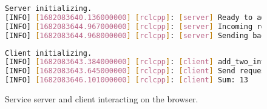         \begin{figure}[htbp]
            \vspace{1em}

            \begin{lstlisting}[language=Bash]
Server initializing.
[INFO] [1682083640.136000000] [rclcpp]: [server] Ready to add two ints.
[INFO] [1682083644.967000000] [rclcpp]: [server] Incoming request X: 5 Y: 8
[INFO] [1682083644.968000000] [rclcpp]: [server] Sending back response: [13]
\end{lstlisting}

            \vspace{2em}

            \begin{lstlisting}[language=Bash]
Client initializing.
[INFO] [1682083643.384000000] [rclcpp]: [client] add_two_ints_client X Y
[INFO] [1682083643.645000000] [rclcpp]: [client] Send request X: 5  Y: 8
[INFO] [1682083646.101000000] [rclcpp]: [client] Sum: 13
\end{lstlisting}

            \caption{Service server and client interacting on the browser.}
            \label{fig:ui4}
        \end{figure}

